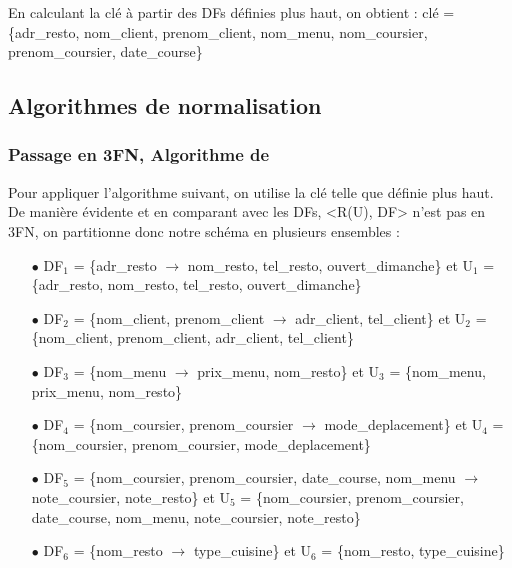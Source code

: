 \documentclass[french]{article}
\begin{document}
        En calculant la clé à partir des DFs définies plus haut, on obtient : \newline
            clé = \{adr\_resto, nom\_client, prenom\_client, nom\_menu, nom\_coursier, prenom\_coursier, \newline date\_course\}
        \newpage
    \subsection*{Algorithmes de normalisation}
        \subsubsection *{Passage en 3FN, Algorithme de }
            Pour appliquer l'algorithme suivant, on utilise la clé telle que définie plus haut. De manière évidente et en comparant avec les DFs, <R(U), DF> n'est pas en 3FN, on partitionne donc notre schéma en plusieurs ensembles :
            \begin{itemize}
                \item[$\bullet$] DF$_{1}$ = \{adr\_resto $\rightarrow$ nom\_resto, tel\_resto, ouvert\_dimanche\} \newline et U$_{1}$ = \{adr\_resto, nom\_resto, tel\_resto, ouvert\_dimanche\}
                
                \item[$\bullet$] DF$_{2}$ = \{nom\_client, prenom\_client $\rightarrow$ adr\_client, tel\_client\} \newline et U$_{2}$ = \{nom\_client, prenom\_client, adr\_client, tel\_client\}
                
                \item[$\bullet$] DF$_{3}$ = \{nom\_menu $\rightarrow$ prix\_menu, nom\_resto\} \newline et U$_{3}$ = \{nom\_menu, prix\_menu, nom\_resto\}
                
                \item[$\bullet$] DF$_{4}$ = \{nom\_coursier, prenom\_coursier $\rightarrow$  mode\_deplacement\} \newline et U$_{4}$ = \{nom\_coursier, prenom\_coursier, mode\_deplacement\}
                
                \item[$\bullet$] DF$_{5}$ = \{nom\_coursier, prenom\_coursier, date\_course, nom\_menu $\rightarrow$ note\_coursier, \newline note\_resto\} 
                \newline et U$_{5}$ = \{nom\_coursier, prenom\_coursier, date\_course, nom\_menu, note\_coursier, \newline note\_resto\}
                
                \item[$\bullet$] DF$_{6}$ = \{nom\_resto $\rightarrow$ type\_cuisine\} et U$_{6}$ = \{nom\_resto, type\_cuisine\}
            \end{itemize}
            
\end{document}
